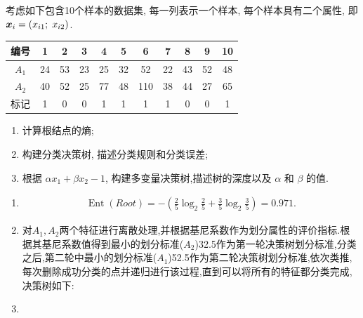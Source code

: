 \documentclass[answers]{exam}  %
\begin{document}
\begin{questions}
    考虑如下包含10个样本的数据集, 每一列表示一个样本, 每个样本具有二个属性, 即${\boldsymbol{x}}_i = (x_{i1};\; x_{i2})$.
    \begin{table}[ht]
        \begin{center}
            \begin{tabular}{ccccccccccc}
                \hline 编号  & 1  & 2  & 3  & 4  & 5  & 6   & 7  & 8  & 9  & 10 \\
                \hline $A_1$ & 24 & 53 & 23 & 25 & 32 & 52  & 22 & 43 & 52 & 48 \\
                $A_2$        & 40 & 52 & 25 & 77 & 48 & 110 & 38 & 44 & 27 & 65 \\
                \hline 标记  & 1  & 0  & 0  & 1  & 1  & 1   & 1  & 0  & 0  & 1  \\
                \hline
            \end{tabular}
        \end{center}
    \end{table}
    \begin{enumerate}
        \item 计算根结点的熵;
        \item 构建分类决策树, 描述分类规则和分类误差;
        \item 根据 $\alpha x_{1}+\beta x_{2}-1$,  构建多变量决策树,描述树的深度以及 $\alpha$ 和 $\beta$ 的值.
    \end{enumerate}
    \begin{solution}
        \begin{enumerate}
            \item
                  \begin{align*}
                      \operatorname{Ent}(Root)=-(\frac{2}{5} \log_2 \frac{2}{5}+\frac{3}{5} \log_2\frac{3}{5})=0.971.
                  \end{align*}
            \item 对$A_1,A_2$两个特征进行离散处理,并根据基尼系数作为划分属性的评价指标.根据其基尼系数值得到最小的划分标准($A_2$)32.5作为第一轮决策树划分标准,分类之后,第二轮中最小的划分标准($A_1$)52.5作为第二轮决策树划分标准,依次类推,每次删除成功分类的点并递归进行该过程,直到可以将所有的特征都分类完成,决策树如下:
            \item \begin{figure}[H]
                      \centering

\end{figure}
\end{enumerate}
\end{solution}
\end{questions}
\end{document}
